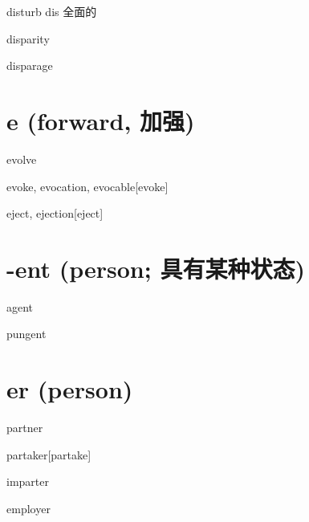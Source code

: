 \begin{RefWord}{disturb}
    dis 全面的
\end{RefWord}

\begin{RefWord}{disparity}
\end{RefWord}

\begin{RefWord}{disparage}
\end{RefWord}

\section{e (forward, 加强)}

\begin{RefWord}{evolve}
\end{RefWord}

\begin{RefWord}{evoke, evocation, evocable}[evoke]
\end{RefWord}

\begin{RefWord}{eject, ejection}[eject]
\end{RefWord}

\section{-ent (person; 具有某种状态)}

\begin{RefWord}{agent}
\end{RefWord}

\begin{RefWord}{pungent}
\end{RefWord}

\section{er (person)}

\begin{RefWord}{partner}
\end{RefWord}

\begin{RefWord}{partaker}[partake]
\end{RefWord}

\begin{RefWord}{imparter}
\end{RefWord}

\begin{RefWord}{employer}
\end{RefWord}


